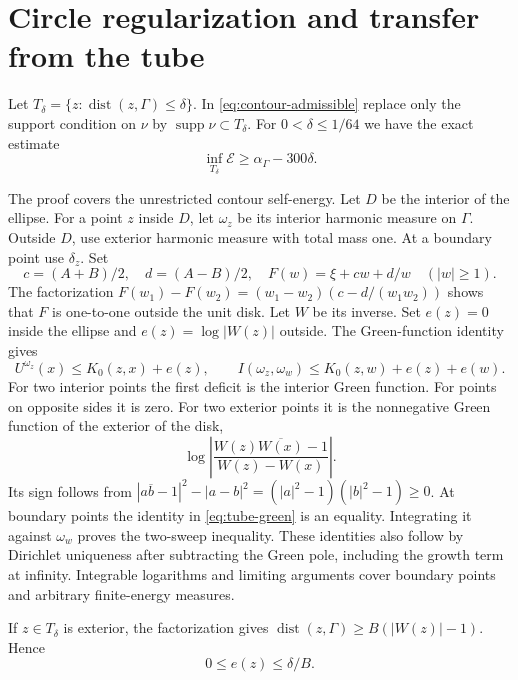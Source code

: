 \section{Circle regularization and transfer from the tube}\label{sec:tube}

Let \(T_\delta=\{z:\operatorname{dist}(z,\Gamma)\le\delta\}\). In
\eqref{eq:contour-admissible} replace only the support condition on \(\nu\)
by \(\operatorname{supp}\nu\subset T_\delta\). For \(0<\delta\le1/64\) we
have the exact estimate
\begin{equation}\label{eq:tube-transfer}
 \inf_{T_\delta}\mathcal E\ge\alpha_\Gamma-300\delta.
\end{equation}

The proof covers the unrestricted contour self-energy. Let \(D\) be the
interior of the ellipse. For a point \(z\) inside \(D\), let \(\omega_z\) be
its interior harmonic measure on \(\Gamma\). Outside \(D\), use exterior
harmonic measure with total mass one. At a boundary point use
\(\delta_z\). Set
\[
 c=(A+B)/2,\quad d=(A-B)/2,\quad
 F(w)=\xi+cw+d/w\quad(|w|\ge1).
\]
The factorization \(F(w_1)-F(w_2)=(w_1-w_2)(c-d/(w_1w_2))\) shows that
\(F\) is one-to-one outside the unit disk. Let \(W\) be its inverse. Set
\(e(z)=0\) inside the ellipse and \(e(z)=\log|W(z)|\) outside. The
Green-function identity gives
\begin{equation}\label{eq:tube-green}
 U^{\omega_z}(x)\le K_0(z,x)+e(z),\qquad
 I(\omega_z,\omega_w)\le K_0(z,w)+e(z)+e(w).
\end{equation}
For two interior points the first deficit is the interior Green function.
For points on opposite sides it is zero. For two exterior points it is the
nonnegative Green function of the exterior of the disk,
\[
 \log\left|\frac{W(z)\overline{W(x)}-1}{W(z)-W(x)}\right|.
\]
Its sign follows from
\(|a\overline b-1|^2-|a-b|^2=(|a|^2-1)(|b|^2-1)\ge0\). At boundary points
the identity in \eqref{eq:tube-green} is an equality. Integrating it
against \(\omega_w\) proves the two-sweep inequality. These identities also
follow by Dirichlet uniqueness after subtracting the Green pole, including
the growth term at infinity. Integrable logarithms and limiting arguments
cover boundary points and arbitrary finite-energy measures.

If \(z\in T_\delta\) is exterior, the factorization gives
\(\operatorname{dist}(z,\Gamma)\ge B(|W(z)|-1)\). Hence
\begin{equation}\label{eq:tube-e}
 0\le e(z)\le\delta/B.
\end{equation}

